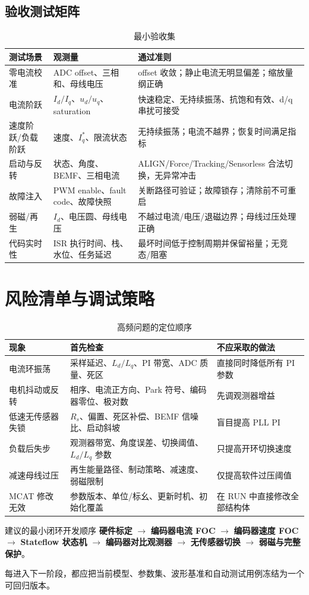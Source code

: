 \documentclass[UTF8,a4paper,11pt,fontset=windows]{ctexart}
\begin{document}
\subsection{验收测试矩阵}
\begin{table}[htbp]
\centering
\caption{最小验收集}
\begin{tabularx}{\textwidth}{p{}Y Y}
\toprule
测试场景 & 观测量 & 通过准则 \\
\midrule
零电流校准 & ADC offset、三相和、母线电压 & offset 收敛；静止电流无明显偏差；缩放量纲正确 \\
电流阶跃 & $I_d/I_q$、$u_d/u_q$、saturation & 快速稳定、无持续振荡、抗饱和有效、d/q 串扰可接受 \\
速度阶跃/负载阶跃 & 速度、$I_q^*$、限流状态 & 无持续振荡；电流不越界；恢复时间满足指标 \\
启动与反转 & 状态、角度、BEMF、三相电流 & ALIGN/Force/Tracking/Sensorless 合法切换，无异常冲击 \\
故障注入 & PWM enable、fault code、故障快照 & 关断路径可验证；故障锁存；清除前不可重启 \\
弱磁/再生 & $I_d$、电压圆、母线电压 & 不越过电流/电压/退磁边界；母线过压处理正确 \\
代码实时性 & ISR 执行时间、栈、水位、任务延迟 & 最坏时间低于控制周期并保留裕量；无竞态/阻塞 \\
\bottomrule
\end{tabularx}
\end{table}
\section{风险清单与调试策略}
\begin{table}[htbp]
\centering
\caption{高频问题的定位顺序}
\begin{tabularx}{\textwidth}{p{}Y Y}
\toprule
现象 & 首先检查 & 不应采取的做法 \\
\midrule
电流环振荡 & 采样延迟、$L_d/L_q$、PI 带宽、ADC 质量、死区 & 直接同时降低所有 PI 参数 \\
电机抖动或反转 & 相序、电流正方向、Park 符号、编码器零位、极对数 & 先调观测器增益 \\
低速无传感器失锁 & $R_s$、偏置、死区补偿、BEMF 信噪比、启动斜坡 & 盲目提高 PLL PI \\
负载后失步 & 观测器带宽、角度误差、切换阈值、$L_d/L_q$ 参数 & 只提高开环切换速度 \\
减速母线过压 & 再生能量路径、制动策略、减速度、弱磁限制 & 仅提高软件过压阈值 \\
MCAT 修改无效 & 参数版本、单位/标幺、更新时机、初始化覆盖 & 在 RUN 中直接修改全部结构体 \\
\bottomrule
\end{tabularx}
\end{table}
\begin{keybox}{建议的最小闭环开发顺序}
\textbf{硬件标定} $\rightarrow$ \textbf{编码器电流 FOC} $\rightarrow$ \textbf{编码器速度 FOC} $\rightarrow$ \textbf{Stateflow 状态机} $\rightarrow$ \textbf{编码器对比观测器} $\rightarrow$ \textbf{无传感器切换} $\rightarrow$ \textbf{弱磁与完整保护}。\par
每进入下一阶段，都应把当前模型、参数集、波形基准和自动测试用例冻结为一个可回归版本。
\end{keybox}
\clearpage
\end{document}
